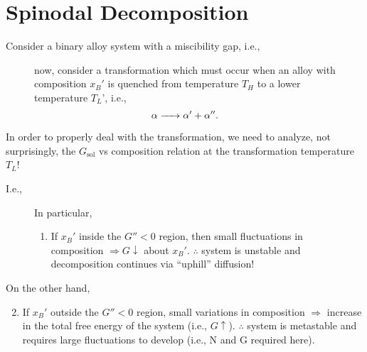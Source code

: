 \documentclass[12pt]{article}
\begin{document}
\setcounter{section}{12}
\section{Spinodal Decomposition}

Consider a binary alloy system with a miscibility gap,
i.e.,
\begin{figure}[h]
 \begin{minipage}[l]{0.3\textwidth}
  
 \end{minipage}%
 \hfil
 \begin{minipage}[r]{0.6\textwidth}
  now, consider a transformation which must occur when an alloy
  with composition $x_B'$ is quenched from temperature $T_H$
  to a lower temperature $T_L$', i.e.,
  \begin{equation*}
   \ce{$\alpha$ -> $\alpha' + \alpha''$}.
  \end{equation*}
 \end{minipage}
\end{figure}

In order to properly deal with the transformation, we need to analyze,
not surprisingly, the $G_{\text{sol}}$ vs composition relation at the
transformation temperature $T_L$!

I.e.,
\begin{figure}[h]
 \begin{minipage}[l]{0.3\textwidth}
  
 \end{minipage}%
 \hfil
 \begin{minipage}[r]{0.6\textwidth}
  In particular,
  \begin{enumerate}
   \item If $x_B'$ inside the $G''<0$ region, then small fluctuations
         in composition $\Rightarrow G \downarrow$ about $x_B'$.
         $\therefore$ system is unstable and decomposition continues via
         ``uphill'' diffusion!
  \end{enumerate}
 \end{minipage}
\end{figure}

On the other hand,
\begin{enumerate}
 \setcounter{enumi}{1}
 \item If $x_B'$ outside the $G''<0$ region,
       small variations in composition $\Rightarrow$ increase in the total
       free energy of the system (i.e., $G \uparrow$).
       $\therefore$ system is metastable and requires large fluctuations to
       develop  (i.e., N and G required here).
\end{enumerate}
\end{document}
